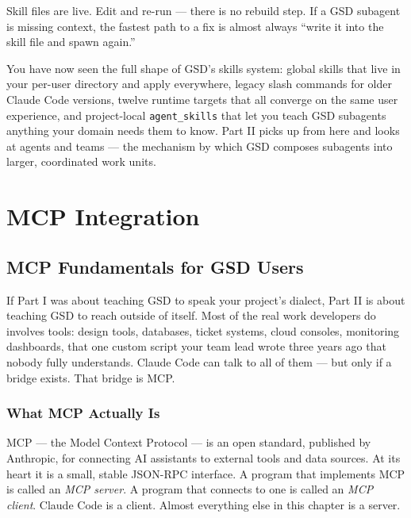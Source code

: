 \documentclass[11pt,letterpaper,openany]{book}
\begin{document}
\begin{gsdtip}
Skill files are live. Edit and re-run --- there is no rebuild step.
If a GSD subagent is missing context, the fastest path to a fix is
almost always ``write it into the skill file and spawn again.''
\end{gsdtip}

\begin{gsdsuccess}
You have now seen the full shape of GSD's skills system: global skills
that live in your per-user directory and apply everywhere, legacy slash
commands for older Claude Code versions, twelve runtime targets that
all converge on the same user experience, and project-local
\texttt{agent\_skills} that let you teach GSD subagents anything your
domain needs them to know. Part II picks up from here and looks at
agents and teams --- the mechanism by which GSD composes subagents into
larger, coordinated work units.
\end{gsdsuccess}

\part{MCP Integration}

\chapter{MCP Fundamentals for GSD Users}

If Part I was about teaching GSD to speak your project's dialect, Part II
is about teaching GSD to reach outside of itself. Most of the real work
developers do involves tools: design tools, databases, ticket systems,
cloud consoles, monitoring dashboards, that one custom script your team
lead wrote three years ago that nobody fully understands. Claude Code can
talk to all of them --- but only if a bridge exists. That bridge is MCP.

\section{What MCP Actually Is}

MCP --- the Model Context Protocol --- is an open standard, published by
Anthropic, for connecting AI assistants to external tools and data
sources. At its heart it is a small, stable JSON-RPC interface. A program
that implements MCP is called an \emph{MCP server}. A program that
connects to one is called an \emph{MCP client}. Claude Code is a client.
Almost everything else in this chapter is a server.
\end{document}
